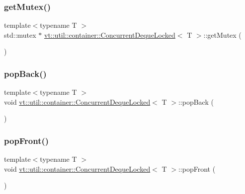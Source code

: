 \subsubsection{\texorpdfstring{get\+Mutex()}{getMutex()}}
{\footnotesize\ttfamily template$<$typename T $>$ \\
std\+::mutex $\ast$ \hyperlink{structvt_1_1util_1_1container_1_1_concurrent_deque_locked}{vt\+::util\+::container\+::\+Concurrent\+Deque\+Locked}$<$ T $>$\+::get\+Mutex (\begin{DoxyParamCaption}{ }\end{DoxyParamCaption})\hspace{0.3cm}{\ttfamily [private]}}

\mbox{\label{structvt_1_1util_1_1container_1_1_concurrent_deque_locked_af5c7291d01a60ba4ea5e773de4c2b8e3}} 
\subsubsection{\texorpdfstring{pop\+Back()}{popBack()}}
{\footnotesize\ttfamily template$<$typename T $>$ \\
void \hyperlink{structvt_1_1util_1_1container_1_1_concurrent_deque_locked}{vt\+::util\+::container\+::\+Concurrent\+Deque\+Locked}$<$ T $>$\+::pop\+Back (\begin{DoxyParamCaption}{ }\end{DoxyParamCaption})}

\mbox{\label{structvt_1_1util_1_1container_1_1_concurrent_deque_locked_a24d80e8f7e30a18175f390e79f061a99}} 
\subsubsection{\texorpdfstring{pop\+Front()}{popFront()}}
{\footnotesize\ttfamily template$<$typename T $>$ \\
void \hyperlink{structvt_1_1util_1_1container_1_1_concurrent_deque_locked}{vt\+::util\+::container\+::\+Concurrent\+Deque\+Locked}$<$ T $>$\+::pop\+Front (\begin{DoxyParamCaption}{ }\end{DoxyParamCaption})}

